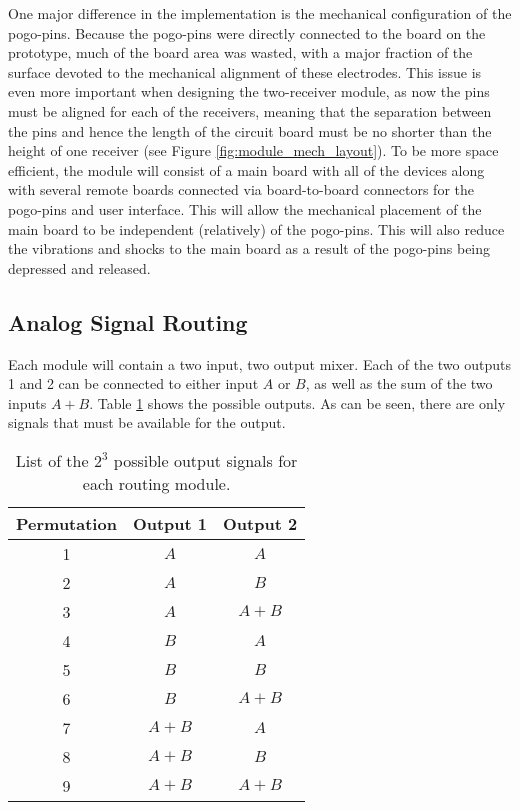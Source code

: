 \documentclass{article}
\begin{document}
	One major difference in the implementation is the mechanical configuration of the pogo-pins.  Because the pogo-pins were directly connected to the board on the prototype, much of the board area was wasted, with a major fraction of the surface devoted to the mechanical alignment of these electrodes.  This issue is even more important when designing the two-receiver module, as now the pins must be aligned for each of the receivers, meaning that the separation between the pins and hence the length of the circuit board must be no shorter than the height of one receiver (see Figure \ref{fig:module_mech_layout}).  To be more space efficient, the module will consist of a main board with all of the devices along with several remote boards connected via board-to-board connectors for the pogo-pins and user interface.  This will allow the mechanical placement of the main board to be independent (relatively) of the pogo-pins.  This will also reduce the vibrations and shocks to the main board as a result of the pogo-pins being depressed and released.

	\subsection{Analog Signal Routing}

	Each module will contain a two input, two output mixer.  Each of the two outputs 1 and 2 can be connected to either input $A$ or $B$, as well as the sum of the two inputs $A + B$.  Table \ref{tab:routing_outputs} shows the possible outputs.  As can be seen, there are only signals that must be available for the output.

	\begin{table}
	\begin{center}
	\begin{tabular}{ |c|c c| }
	\hline
	 Permutation & Output 1 & Output 2 \\ 
	 \hline
	 1 	& $A$ 	& $A$ \\  
	 2 	& $A$ 	& $B$ \\
	 3	& $A$ 	& $A+B$ \\
	 4	& $B$ 	& $A$ \\
	 5	& $B$ 	& $B$ \\
	 6	& $B$ 	& $A+B$ \\
	 7	& $A+B$ & $A$ \\
	 8	& $A+B$ & $B$ \\
	 9	& $A+B$ & $A+B$ \\
	 \hline
	\end{tabular}
	\caption{List of the $2^3$ possible output signals for each routing module.}
	\label{tab:routing_outputs}
	\end{center}
	\end{table}
\end{document}
